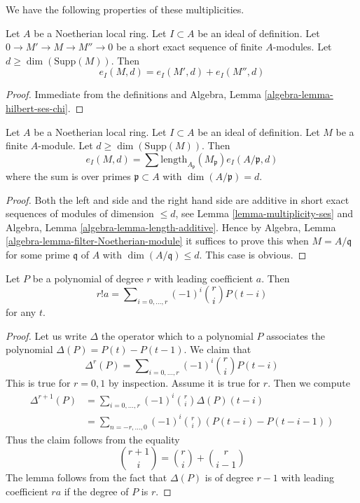 \noindent
We have the following properties of these multiplicities.

\begin{lemma}
\label{lemma-multiplicity-ses}
Let $A$ be a Noetherian local ring. Let $I \subset A$ be an ideal of
definition. Let $0 \to M' \to M \to M'' \to 0$ be a short exact sequence
of finite $A$-modules. Let $d \geq \dim(\text{Supp}(M))$. Then
$$
e_I(M, d) = e_I(M', d) + e_I(M'', d)
$$
\end{lemma}

\begin{proof}
Immediate from the definitions and
Algebra, Lemma \ref{algebra-lemma-hilbert-ses-chi}.
\end{proof}

\begin{lemma}
\label{lemma-multiplicity-as-a-sum}
Let $A$ be a Noetherian local ring. Let $I \subset A$ be an ideal of
definition. Let $M$ be a finite $A$-module. Let $d \geq \dim(\text{Supp}(M))$.
Then
$$
e_I(M, d) =
\sum \text{length}_{A_\mathfrak p}(M_\mathfrak p) e_I(A/\mathfrak p, d)
$$
where the sum is over primes $\mathfrak p \subset A$ with
$\dim(A/\mathfrak p) = d$.
\end{lemma}

\begin{proof}
Both the left and side and the right hand side are additive in short
exact sequences of modules of dimension $\leq d$, see
Lemma \ref{lemma-multiplicity-ses} and
Algebra, Lemma \ref{algebra-lemma-length-additive}.
Hence by Algebra, Lemma \ref{algebra-lemma-filter-Noetherian-module}
it suffices to prove this when $M = A/\mathfrak q$ for some
prime $\mathfrak q$ of $A$ with $\dim(A/\mathfrak q) \leq d$.
This case is obvious.
\end{proof}

\begin{lemma}
\label{lemma-leading-coefficient}
Let $P$ be a polynomial of degree $r$ with leading coefficient $a$.
Then
$$
r! a = \sum\nolimits_{i = 0, \ldots, r} (-1)^i{r \choose i} P(t - i)
$$
for any $t$.
\end{lemma}

\begin{proof}
Let us write $\Delta$ the operator which to a polynomial $P$ associates
the polynomial $\Delta(P) = P(t) - P(t - 1)$. We claim that
$$
\Delta^r(P) = \sum\nolimits_{i = 0, \ldots, r} (-1)^i {r \choose i} P(t - i)
$$
This is true for $r = 0, 1$ by inspection. Assume it is true for $r$.
Then we compute
\begin{align*}
\Delta^{r + 1}(P)
& =
\sum\nolimits_{i = 0, \ldots, r} (-1)^i {r \choose i} \Delta(P)(t - i) \\
& =
\sum\nolimits_{n = -r, \ldots, 0} (-1)^i {r \choose i}
(P(t - i) - P(t - i - 1))
\end{align*}
Thus the claim follows from the equality
$$
{r + 1 \choose i} = {r \choose i} + {r \choose i - 1}
$$
The lemma follows from the fact that $\Delta(P)$ is of degree $r - 1$
with leading coefficient $ra$ if the degree of $P$ is $r$.
\end{proof}

